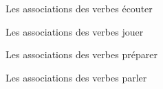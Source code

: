 \begin{frame}{Les associations des verbes }
  \centering
  écouter

\end{frame}

\begin{frame}{Les associations des verbes }
  \centering
  jouer

\end{frame}

\begin{frame}{Les associations des verbes }
  \centering
  préparer

\end{frame}

\begin{frame}{Les associations des verbes }
  \centering
  parler

\end{frame}



